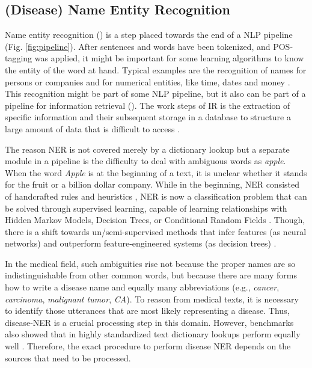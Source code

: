 \subsection{(Disease) Name Entity Recognition}
Name entity recognition () is a step placed towards the end of a NLP pipeline (Fig. \ref{fig:pipeline}).
After sentences and words have been tokenized, and POS-tagging was applied, it might be important for some learning algorithms to know the entity of the word at hand.
Typical examples are the recognition of names for persons or companies and for numerical entities, like time, dates and money \citep{Nadeau2009}.
This recognition might be part of some NLP pipeline, but it also can be part of a pipeline for information retrieval ().
The work steps of IR is the extraction of specific information and their subsequent storage in a database to structure a large amount of data that is difficult to access \citep{Manning2008, Wei2011}.

The reason NER is not covered merely by a dictionary lookup but a separate module in a pipeline is the difficulty to deal with ambiguous words as \textit{apple}.
When the word \textit{Apple} is at the beginning of a text, it is unclear whether it stands for the fruit or a billion dollar company.
While in the beginning, NER consisted of handcrafted rules and heuristics \citep{Rau1991}, NER is now a classification problem that can be solved through supervised learning, capable of learning relationships with Hidden Markov Models, Decision Trees, or Conditional Random Fields \citep{Nadeau2009}.
Though, there is a shift towards un/semi-supervised methods that infer features (as neural networks) and outperform feature-engineered systems (as decision trees) \citep{Yadav2018}.

In the medical field, such ambiguities rise not because the proper names are so indistinguishable from other common words, but because there are many forms how to write a disease name and equally many abbreviations (e.g., \textit{cancer}, \textit{carcinoma}, \textit{malignant tumor}, \textit{CA}).
To reason from medical texts, it is necessary to identify those utterances that are most likely representing a disease.
Thus, disease-NER is a crucial processing step in this domain.
However, benchmarks also showed that in highly standardized text dictionary lookups perform equally well \citep{Jimeno2007}.
Therefore, the exact procedure to perform disease NER depends on the sources that need to be processed.

